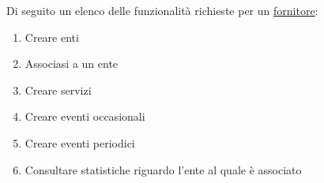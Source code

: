 Di seguito un elenco delle funzionalità richieste per un \ul{fornitore}: 
\begin{enumerate}[label=b\arabic*)]
    \item Creare enti
    \item Associasi a un ente
    \item Creare servizi
    \item Creare eventi occasionali
    \item Creare eventi periodici
    \item Consultare statistiche riguardo l'ente al quale è associato 
\end{enumerate}
